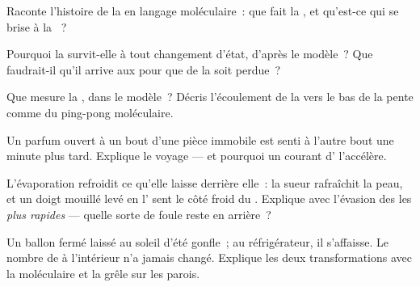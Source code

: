 \begin{exercise}[$\star$]\label{exo:g7:states-of-matter:5}
Raconte l'histoire de la  en langage moléculaire~: que fait la
, et qu'est-ce qui se brise à la ~?
\end{exercise}

\begin{exercise}[$\star$]\label{exo:g7:states-of-matter:6}
Pourquoi la  survit-elle à tout changement d'état, d'après le
modèle~? Que faudrait-il qu'il arrive aux  pour que de la
 soit perdue~?
\end{exercise}

\begin{exercise}[$\star$]\label{exo:g7:states-of-matter:7}
Que mesure la , dans le modèle~? Décris l'écoulement de la
 vers le bas de la pente comme du ping-pong moléculaire.
\end{exercise}

\begin{exercise}[$\star$]\label{exo:g7:states-of-matter:8}
Un parfum ouvert à un bout d'une pièce immobile est senti à l'autre
bout une minute plus tard. Explique le voyage --- et pourquoi un
courant d' l'accélère.
\end{exercise}

\begin{exercise}[$\star\star$]\label{exo:g7:states-of-matter:9}
L'évaporation refroidit ce qu'elle laisse derrière elle~: la sueur
rafraîchit la peau, et un doigt mouillé levé en l' sent le côté
froid du . Explique avec l'évasion des  les \emph{plus
rapides} --- quelle sorte de foule reste en arrière~?
\end{exercise}

\begin{exercise}[$\star\star$]\label{exo:g7:states-of-matter:10}
Un ballon fermé laissé au soleil d'été gonfle~; au réfrigérateur, il
s'affaisse. Le nombre de  à l'intérieur n'a jamais changé.
Explique les deux transformations avec la  moléculaire et la
grêle sur les parois.
\end{exercise}

